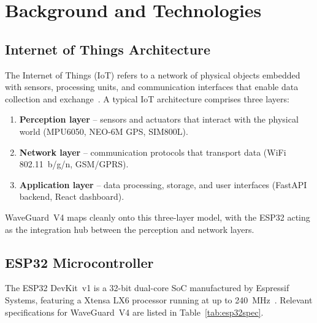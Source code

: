 
\chapter{Background and Technologies}
\label{chap:background}

\section{Internet of Things Architecture}

The Internet of Things (IoT) refers to a network of physical objects embedded with
sensors, processing units, and communication interfaces that enable data collection
and exchange~\cite{alfuqaha2015iot}.
A typical IoT architecture comprises three layers:

\begin{enumerate}
  \item \textbf{Perception layer} – sensors and actuators that interact with the
        physical world (MPU6050, NEO-6M GPS, SIM800L).
  \item \textbf{Network layer} – communication protocols that transport data
        (WiFi 802.11~b/g/n, GSM/GPRS).
  \item \textbf{Application layer} – data processing, storage, and user interfaces
        (FastAPI backend, React dashboard).
\end{enumerate}

WaveGuard~V4 maps cleanly onto this three-layer model, with the ESP32 acting as the
integration hub between the perception and network layers.

\section{ESP32 Microcontroller}

The ESP32 DevKit~v1 is a 32-bit dual-core SoC manufactured by Espressif Systems,
featuring a Xtensa LX6 processor running at up to 240~MHz~\cite{espressif2023esp32}.
Relevant specifications for WaveGuard~V4 are listed in Table~\ref{tab:esp32spec}.

